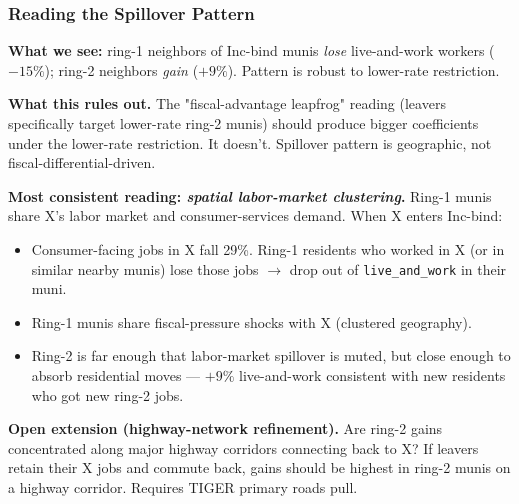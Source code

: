 \documentclass[xcolor = x11names, compress, aspectratio = 169]{beamer}
\begin{document}
    \begin{frame}
    \frametitle{Reading the Spillover Pattern}
        \footnotesize
        \textbf{What we see:} ring-1 neighbors of Inc-bind munis \emph{lose}
        live-and-work workers ($-15\%$); ring-2 neighbors \emph{gain} ($+9\%$).
        Pattern is robust to lower-rate restriction.
        \medskip

        \textbf{What this rules out.} The "fiscal-advantage leapfrog" reading
        (leavers specifically target lower-rate ring-2 munis) should produce
        bigger coefficients under the lower-rate restriction. It doesn't.
        Spillover pattern is geographic, not fiscal-differential-driven.
        \medskip

        \textbf{Most consistent reading: \emph{spatial labor-market clustering}.}
        Ring-1 munis share X's labor market and consumer-services demand. When X
        enters Inc-bind:
        \begin{itemize}\setlength{\itemsep}{0.02cm}\scriptsize
            \item Consumer-facing jobs in X fall 29\%. Ring-1 residents who
            worked in X (or in similar nearby munis) lose those jobs $\to$
            drop out of \texttt{live\_and\_work} in their muni.
            \item Ring-1 munis share fiscal-pressure shocks with X (clustered geography).
            \item Ring-2 is far enough that labor-market spillover is muted, but
            close enough to absorb residential moves --- $+9\%$ live-and-work
            consistent with new residents who got new ring-2 jobs.
        \end{itemize}
        \medskip

        \textbf{Open extension (highway-network refinement).} Are ring-2 gains
        concentrated along major highway corridors connecting back to X? If
        leavers retain their X jobs and commute back, gains should be highest
        in ring-2 munis on a highway corridor. Requires TIGER primary roads pull.
    \end{frame}
\end{document}
